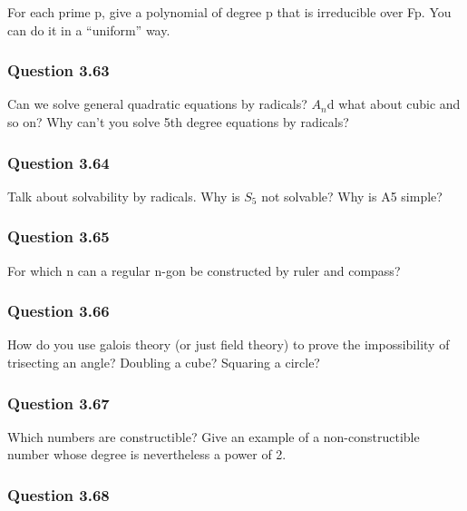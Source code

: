 For each prime p, give a polynomial of degree p that is irreducible over
Fp. You can do it in a ``uniform'' way.

\hypertarget{question-3.63}{%
\subsubsection{Question 3.63}\label{question-3.63}}

Can we solve general quadratic equations by radicals? \(A_n\)d what
about cubic and so on? Why can't you solve 5th degree equations by
radicals?

\hypertarget{question-3.64}{%
\subsubsection{Question 3.64}\label{question-3.64}}

Talk about solvability by radicals. Why is \(S_5\) not solvable? Why is
A5 simple?

\hypertarget{question-3.65}{%
\subsubsection{Question 3.65}\label{question-3.65}}

For which n can a regular n-gon be constructed by ruler and compass?

\hypertarget{question-3.66}{%
\subsubsection{Question 3.66}\label{question-3.66}}

How do you use galois theory (or just field theory) to prove the
impossibility of trisecting an angle? Doubling a cube? Squaring a
circle?

\hypertarget{question-3.67}{%
\subsubsection{Question 3.67}\label{question-3.67}}

Which numbers are constructible? Give an example of a non-constructible
number whose degree is nevertheless a power of 2.

\hypertarget{question-3.68}{%
\subsubsection{Question 3.68}\label{question-3.68}}

